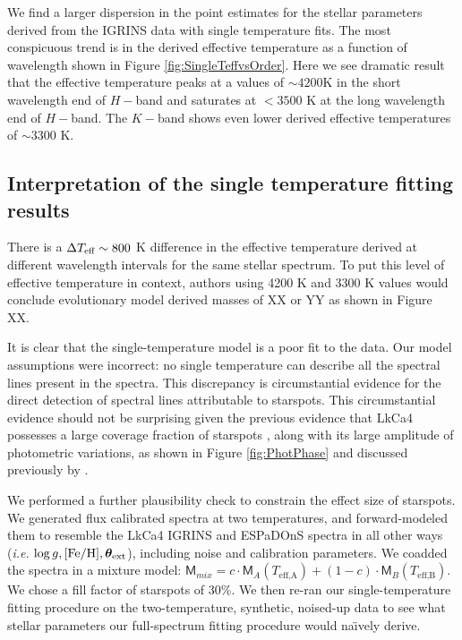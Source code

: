 \documentclass[onecolumn]{emulateapj}%
\newcommand{\name}{LkCa4 }
\begin{document}
We find a larger dispersion in the point estimates for the stellar parameters derived from the IGRINS data with single temperature fits.  The most conspicuous trend is in the derived effective temperature as a function of wavelength shown in Figure \ref{fig:SingleTeffvsOrder}.  Here we see dramatic result that the effective temperature peaks at a values of $\sim4200$K in the short wavelength end of $H-$band and saturates at $<3500$ K at the long wavelength end of $H-$band.  The $K-$band shows even lower derived effective temperatures of $\sim3300$ K.

\subsection{Interpretation of the single temperature fitting results}

There is a $\Delta T_\textrm{eff} \sim 800$ K difference in the effective temperature derived at different wavelength intervals for the same stellar spectrum.  To put this level of effective temperature in context, authors using 4200 K and 3300 K values would conclude evolutionary model derived masses of XX or YY as shown in Figure XX. 

It is clear that the single-temperature model is a poor fit to the data.  Our model assumptions were incorrect: no single temperature can describe all the spectral lines present in the spectra.  This discrepancy is circumstantial evidence for the direct detection of spectral lines attributable to starspots.  This circumstantial evidence should not be surprising given the previous evidence that \name possesses a large coverage fraction of starspots \citep{2014MNRAS.444.3220D}, along with its large amplitude of photometric variations, as shown in Figure \ref{fig:PhotPhase} and discussed previously by \citet{grankin08}.

We performed a further plausibility check to constrain the effect size of starspots.  We generated flux calibrated spectra at two temperatures, and forward-modeled them to resemble the LkCa4 IGRINS and ESPaDOnS spectra in all other ways (\emph{i.e.} $\log g, [{\rm Fe}/{\rm H}], {\bm \theta}_{\rm ext}$), including noise and calibration parameters.  We coadded the spectra in a mixture model:  $ \mathsf{M}_{mix} = c \cdot \mathsf{M}_A(T_\textrm{eff,A}) + (1-c) \cdot \mathsf{M}_B(T_\textrm{eff,B})$.  We chose a fill factor of starspots of 30\%.  We then re-ran our single-temperature fitting procedure on the two-temperature, synthetic, noised-up data to see what stellar parameters our full-spectrum fitting procedure would na\"{\i}vely derive.  
\end{document}
